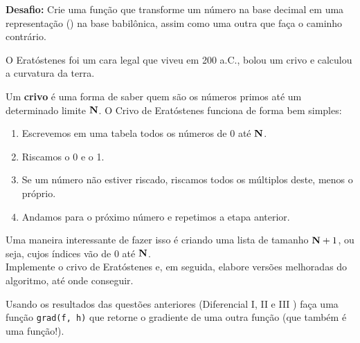 \documentclass[12pt]{article}
\begin{document}
	\textbf{Desafio:} Crie uma função que transforme um número na base decimal em uma representação () na base babilônica, assim como uma outra que faça o caminho contrário.	
		
	
	
	
	O Eratóstenes foi um cara legal que viveu em 200 a.C., bolou um crivo e calculou a curvatura da terra.
	
	
	Um \textbf{crivo} é uma forma de saber quem são os números primos até um determinado limite $\mathbf{N}$. O Crivo de Eratóstenes funciona de forma bem simples:
	
	\begin{enumerate}
		\item Escrevemos em uma tabela todos os números de 0 até $\mathbf{N}$.
		\item Riscamos o 0 e o 1.
		
		\item Se um número não estiver riscado, riscamos todos os múltiplos deste, menos o próprio.
		
		\item Andamos para o próximo número e repetimos a etapa anterior.		
	\end{enumerate}
	
	Uma maneira interessante de fazer isso é criando uma lista de tamanho $\mathbf{N} + 1$, ou seja, cujos índices vão de 0 até $\mathbf{N}$.\\

	\quest Implemente o crivo de Eratóstenes e, em seguida, elabore versões melhoradas do algoritmo, até onde conseguir.
	
	
	\quest Usando os resultados das questões anteriores (Diferencial I, II e III ) faça uma função \texttt{grad(f, h)} que retorne o gradiente de uma outra função (que também é uma função!).
	
	
	
	
	
	
	
	
	
	
\end{document}
